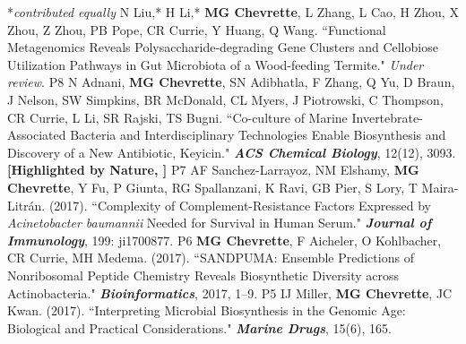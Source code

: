


\begin{cvpubs}
  \cvpub
    {\hspace{-1cm} *\textit{contributed equally}} %
    {} %
  \cvpub
    {N Liu,* H Li,* \textbf{MG Chevrette}, L Zhang, L Cao, H Zhou, X Zhou, Z Zhou, PB Pope, CR Currie, Y Huang, Q Wang. ``Functional Metagenomics Reveals Polysaccharide-degrading Gene Clusters and Cellobiose Utilization Pathways in Gut Microbiota of a Wood-feeding Termite." \textit{Under review}.
    } %
    {P8} %
  \cvpub
    {N Adnani, \textbf{MG Chevrette}, SN Adibhatla, F Zhang, Q Yu, D Braun, J Nelson, SW Simpkins, BR McDonald, CL Myers, J Piotrowski, C Thompson, CR Currie, L Li, SR Rajski, TS Bugni. ``Co-culture of Marine Invertebrate-Associated Bacteria and Interdisciplinary Technologies Enable Biosynthesis and Discovery of a New Antibiotic, Keyicin." \textit{\textbf{ACS Chemical Biology}}, 12(12), 3093.  \textbf{\textit{}} 
    \linebreak \textbf{[Highlighted by Nature, \textit{}]}
    } %
    {P7} %
  \cvpub
    {AF Sanchez-Larrayoz, NM Elshamy, \textbf{MG Chevrette}, Y Fu, P Giunta, RG Spallanzani, K Ravi, GB Pier, S Lory, T Maira-Litr\'{a}n. (2017). ``Complexity of Complement-Resistance Factors Expressed by \textit{Acinetobacter baumannii} Needed for Survival in Human Serum." \textit{\textbf{Journal of Immunology}}, 199: ji1700877. \textbf{\textit{}} }%
    {P6} %
  \cvpub
    {\textbf{MG Chevrette}, F Aicheler, O Kohlbacher, CR Currie, MH Medema. (2017). ``SANDPUMA: Ensemble Predictions of Nonribosomal Peptide Chemistry Reveals Biosynthetic Diversity across Actinobacteria." \textit{\textbf{Bioinformatics}}, 2017, 1–9. \textbf{\textit{}} } %
    {P5} %
  \cvpub
    {IJ Miller, \textbf{MG Chevrette}, JC Kwan. (2017). ``Interpreting Microbial Biosynthesis in the Genomic Age: Biological and Practical Considerations." \textit{\textbf{Marine Drugs}}, 15(6), 165. \textbf{\textit{}} 
}
\end{cvpubs}
